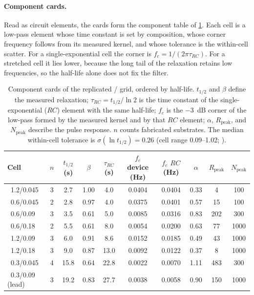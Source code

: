 \documentclass[12pt, twoside]{report}
\begin{document}
\paragraph{Component cards.} Read as circuit elements, the cards form the component table of \cref{tab:ch5_components}. Each cell is a low-pass element whose time constant is set by composition, whose corner frequency follows from its measured kernel, and whose tolerance is the within-cell scatter. For a single-exponential cell the corner is $f_c=1/(2\pi\tau_{RC})$. For a stretched cell it lies lower, because the long tail of the relaxation retains low frequencies, so the half-life alone does not fix the filter.

\begin{table}[t]
  \centering
  \caption[Component cards of the replicated composition grid]{Component cards of the replicated \PEO{}/\LiTf{} grid, ordered by half-life. $t_{1/2}$ and $\beta$ define the measured relaxation; $\tau_{RC}=t_{1/2}/\ln 2$ is the time constant of the single-exponential ($RC$) element with the same half-life; $f_c$ is the \SI{-3}{\deci\bel} corner of the low-pass formed by the measured kernel and by that $RC$ element; $\alpha$, $R_{\mathrm{peak}}$, and $N_{\mathrm{peak}}$ describe the pulse response. $n$ counts fabricated substrates. The median within-cell tolerance is $\sigma(\ln t_{1/2})=\num{0.26}$ (cell range \numrange{0.09}{1.02}; ).}
  \label{tab:ch5_components}
  \scriptsize
  \setlength{\tabcolsep}{3pt}
  \begin{tabular}{@{}lccccccccc@{}}
    \toprule
    Cell & $n$ & $t_{1/2}$ (s) & $\beta$ & $\tau_{RC}$ (s) & $f_c$ device (Hz) & $f_c$ $RC$ (Hz) & $\alpha$ & $R_{\mathrm{peak}}$ & $N_{\mathrm{peak}}$ \\
    \midrule
    \PEO{}~1.2/0.045 & 3 & 2.7 & 1.00 & 4.0 & 0.0404 & 0.0404 & 0.33 & 4 & 100 \\
    \PEO{}~0.6/0.045 & 2 & 2.8 & 0.97 & 4.0 & 0.0375 & 0.0401 & 0.57 & 15 & 100 \\
    \PEO{}~0.6/0.09 & 3 & 3.5 & 0.61 & 5.0 & 0.0085 & 0.0316 & 0.83 & 202 & 300 \\
    \PEO{}~0.6/0.18 & 2 & 5.5 & 0.61 & 8.0 & 0.0054 & 0.0200 & 0.63 & 77 & 1000 \\
    \PEO{}~1.2/0.09 & 3 & 6.0 & 0.91 & 8.6 & 0.0152 & 0.0185 & 0.49 & 43 & 1000 \\
    \PEO{}~1.2/0.18 & 3 & 9.0 & 0.87 & 13.0 & 0.0092 & 0.0122 & 0.37 & 8 & 1000 \\
    \PEO{}~0.3/0.045 & 4 & 15.8 & 0.64 & 22.8 & 0.0022 & 0.0070 & 1.11 & 483 & 300 \\
    \PEO{}~0.3/0.09 (lead) & 3 & 19.2 & 0.83 & 27.7 & 0.0038 & 0.0058 & 0.90 & 150 & 1000 \\
    \bottomrule
  \end{tabular}
\end{table}
\end{document}
